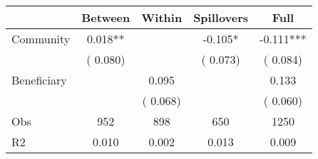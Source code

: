 
\begin{tabular}{l*{4}{c}}\hline&\multicolumn{1}{c}{Between}&\multicolumn{1}{c}{Within}&\multicolumn{1}{c}{Spillovers}&\multicolumn{1}{c}{Full}\\ \hline
 Community             &              0.018**      &                                               &       -0.105* &        -0.111***                            \\ 
                               &        (       0.080)           &                                       &       (       0.073)     &      (       0.084)                                           \\ 
 Beneficiary   &                                               &        0.095    &                                &             0.133                            \\ 
                               &                                               & (       0.068)                  &                                        &      (       0.060)                                           \\ 
\hline                                                                                                                                                                                                                                            
 Obs                   &               952               &       898                       &       650                &              1250                                               \\ 
 R2                    &                      0.010              &              0.002                      &              0.013               &                     0.009                                              \\ 
\hline \end{tabular}                                                                                                                                                                                                              